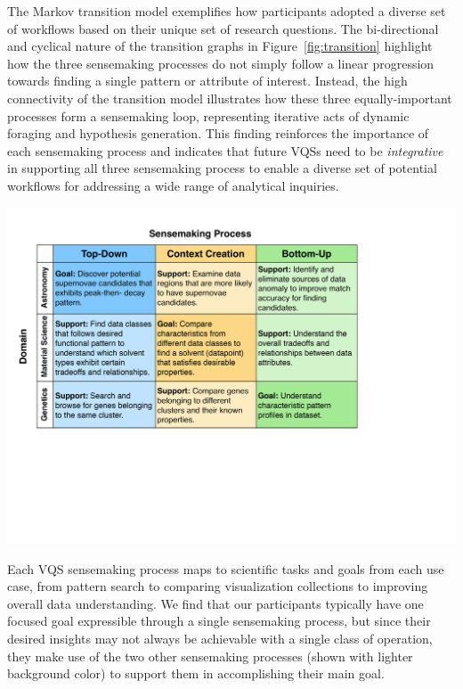  \par The Markov transition model exemplifies how participants
 adopted a diverse set of workflows
 based on their unique set of research questions. The bi-directional and cyclical nature
 of the transition graphs in Figure~\ref{fig:transition} highlight how the three sensemaking processes do not simply follow a linear progression towards finding a single pattern or attribute of interest. %
 Instead, the high connectivity of the transition model illustrates how these three equally-important processes form a sensemaking loop, representing iterative acts of dynamic foraging and hypothesis generation. This finding reinforces the importance of each sensemaking process and indicates that future VQSs need to be \emph{integrative} in supporting all three sensemaking process to enable a diverse set of potential workflows for addressing a wide range of analytical inquiries. %
 \begin{table}[h!]
   \centering
   \includegraphics[width=\linewidth]{figures/science_task.pdf}
   \vspace{-6pt}\caption{Each VQS sensemaking process maps to scientific tasks and goals from each use case, from pattern search to comparing visualization collections to improving overall data understanding. We find that our participants typically have one focused goal expressible through a single sensemaking process, but since their desired insights may not always be achievable with a single class of operation, they make use of the two other sensemaking processes (shown with lighter background color) to support them in accomplishing their main goal.}
   \label{science_task}
   \vspace{-10pt}
\end{table}
